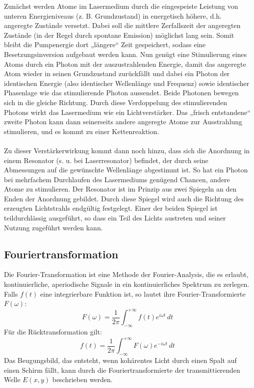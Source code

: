 \documentclass[a4paper,titlepage]{scrartcl}
\numberwithin{equation}{section}
\begin{document}
Zunächst werden Atome im Lasermedium durch die eingespeiste Leistung von unteren Energieniveaus (z. B. Grundzustand) in energetisch höhere, d.h. angeregte Zustände versetzt. Dabei soll die mittlere Zerfallszeit der angeregten Zustände (in der Regel durch spontane Emission) möglichst lang sein. Somit bleibt die Pumpenergie dort „längere“ Zeit gespeichert, sodass eine Besetzungsinversion aufgebaut werden kann. Nun genügt eine Stimulierung eines Atoms durch ein Photon mit der auszustrahlenden Energie, damit das angeregte Atom wieder in seinen Grundzustand zurückfällt und dabei ein Photon der identischen Energie (also identischer Wellenlänge und Frequenz) sowie identischer Phasenlage wie das stimulierende Photon aussendet. Beide Photonen bewegen sich in die gleiche Richtung. Durch diese Verdoppelung des stimulierenden Photons wirkt das Lasermedium wie ein Lichtverstärker. Das „frisch entstandene“ zweite Photon kann dann seinerseits andere angeregte Atome zur Ausstrahlung stimulieren, und es kommt zu einer Kettenreaktion.\\ \\
Zu dieser Verstärkerwirkung kommt dann noch hinzu, dass sich die Anordnung in einem Resonator (s. u. bei Laserresonator) befindet, der durch seine Abmessungen auf die gewünschte Wellenlänge abgestimmt ist. So hat ein Photon bei mehrfachem Durchlaufen des Lasermediums genügend Chancen, andere Atome zu stimulieren. Der Resonator ist im Prinzip aus zwei Spiegeln an den Enden der Anordnung gebildet. Durch diese Spiegel wird auch die Richtung des erzeugten Lichtstrahls endgültig festgelegt. Einer der beiden Spiegel ist teildurchlässig ausgeführt, so dass ein Teil des Lichts austreten und seiner Nutzung zugeführt werden kann.
\subsection{Fouriertransformation}
Die Fourier-Transformation ist eine Methode der Fourier-Analysis, die es erlaubt, kontinuierliche, aperiodische Signale in ein kontinuierliches Spektrum zu zerlegen. Falls $f(t)$ eine integrierbare Funktion ist, so lautet ihre Fourier-Transformierte $F(\omega)$:
\begin{equation*}
F(\omega)=\frac{1}{2 \pi} \int^{+\infty}_{-\infty} f(t) e^{i \omega t} \, dt
\end{equation*}
Für die Rücktransformation gilt:
\begin{equation*}
f(t)=\frac{1}{2 \pi} \int^{+\infty}_{-\infty} F(\omega) e^{-i \omega t} \, dt
\end{equation*}
Das Beugungsbild, das entsteht, wenn kohärentes Licht durch einen Spalt auf einen Schirm fällt, kann durch die Fouriertransformierte der transmittierenden Welle $E(x, y)$ beschrieben werden.
\end{document}
